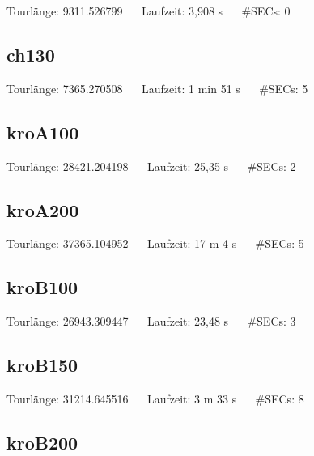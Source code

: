 \documentclass[a4paper, 10pt, ngerman]{article}
\begin{document}


\noindent Tourlänge: 9311.526799 $\quad$ Laufzeit: 3,908 s $\quad$ \#SECs: 0

\subsection{ch130}



\noindent Tourlänge: 7365.270508 $\quad$ Laufzeit: 1 min 51 s $\quad$ \#SECs: 5

\subsection{kroA100}



\noindent Tourlänge: 28421.204198 $\quad$ Laufzeit: 25,35 s $\quad$ \#SECs: 2 

\subsection{kroA200}



\noindent Tourlänge: 37365.104952 $\quad$ Laufzeit: 17 m 4 s $\quad$ \#SECs: 5 

\subsection{kroB100}



\noindent Tourlänge: 26943.309447 $\quad$ Laufzeit: 23,48 s $\quad$ \#SECs: 3 

\subsection{kroB150}



\noindent Tourlänge: 31214.645516 $\quad$ Laufzeit: 3 m 33 s $\quad$ \#SECs: 8

\subsection{kroB200}


\end{document}
